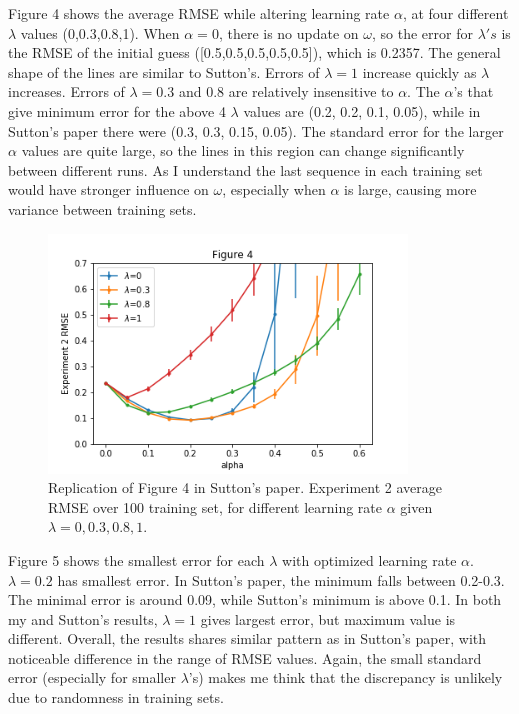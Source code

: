 \documentclass[conference]{IEEEtran}
\begin{document}
	Figure 4 shows the average RMSE while altering learning rate $\alpha$, at four different $\lambda$ values (0,0.3,0.8,1). When $\alpha=0$, there is no update on $\omega$, so the error for $\lambda's$ is the RMSE of the initial guess ([0.5,0.5,0.5,0.5,0.5]), which is 0.2357. The general shape of the lines are similar to Sutton's. Errors of $\lambda=1$ increase quickly as $\lambda$ increases. Errors of $\lambda = 0.3$ and $0.8$ are relatively insensitive to $\alpha$. The $\alpha$'s that give minimum error for the above 4 $\lambda$ values are (0.2, 0.2, 0.1, 0.05), while in Sutton's paper there were (0.3, 0.3, 0.15, 0.05). The standard error for the larger $\alpha$ values are quite large, so the lines in this region can change significantly between different runs. As I understand the last sequence in each training set would have stronger influence on $\omega$, especially when $\alpha$ is large, causing more variance between training sets.
	
	\begin{figure}
		\includegraphics[height=2.5in]{figure4.png} 
		\caption{Replication of Figure 4 in Sutton's paper. Experiment 2 average RMSE over 100 training set, for different learning rate $\alpha$ given $\lambda = 0,0.3,0.8,1$.}
		\label{fig:3}
	\end{figure}
	
	Figure 5 shows the smallest error for each $\lambda$ with optimized learning rate $\alpha$. $\lambda=0.2$ has smallest error. In Sutton's paper, the minimum falls between 0.2-0.3. The minimal error is around 0.09, while Sutton's minimum is above 0.1. In both my and Sutton's results, $\lambda=1$ gives largest error, but maximum value is different. Overall, the results shares similar pattern as in Sutton's paper, with noticeable difference in the range of RMSE values. Again, the small standard error (especially for smaller $\lambda$'s) makes me think that the discrepancy is unlikely due to randomness in training sets.
	
\end{document}
